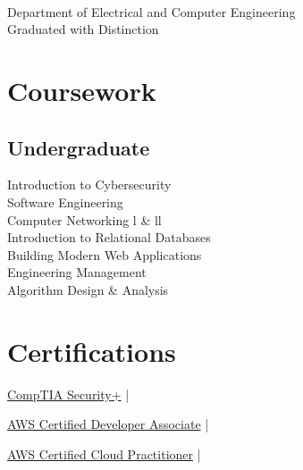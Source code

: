 \documentclass[]{deedy-resume-openfont}
\begin{document}
\begin{minipage}[t]{0.30\textwidth}
 \\
Department of Electrical and Computer Engineering \\
Graduated with Distinction\\
\sectionsep


\section{Coursework}

\subsection{Undergraduate}
Introduction to Cybersecurity \\
Software Engineering \\
Computer Networking l \& ll \\
Introduction to Relational Databases \\
Building Modern Web Applications \\
Engineering Management \\
Algorithm Design \& Analysis \\


\section{Certifications}
\href{https://www.credly.com/badges/31410198-3cd9-41b5-8a41-ef23b5e016b3}{CompTIA Security+} | 

\href{https://www.credly.com/earner/earned/badge/6ab55f9c-1900-4a88-a78f-9402f830ab07}{AWS Certified Developer Associate} | 

\href{https://www.credly.com/badges/1cc9f0d7-2ca2-475e-a5d6-485dc3b4123e}{AWS Certified Cloud Practitioner} | 

%
%

\end{minipage} 
\hfill
\end{document}
